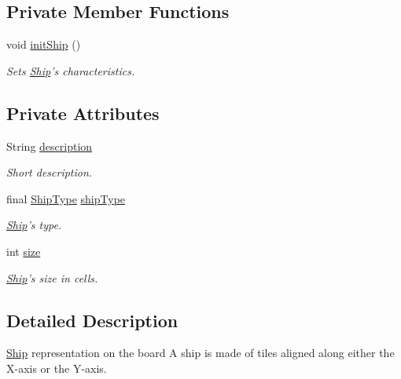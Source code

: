 \subsection*{Private Member Functions}
\begin{DoxyCompactItemize}
\item 
void \hyperlink{classbattleship2D_1_1model_1_1Ship_a677853c8501c31c34d69788df6c1c49d}{init\-Ship} ()
\begin{DoxyCompactList}\small\item\em Sets \hyperlink{classbattleship2D_1_1model_1_1Ship}{Ship}'s characteristics. \end{DoxyCompactList}\end{DoxyCompactItemize}
\subsection*{Private Attributes}
\begin{DoxyCompactItemize}
\item 
String \hyperlink{classbattleship2D_1_1model_1_1Ship_a902a3f9c168d56cc3c8d95747e133a3c}{description}
\begin{DoxyCompactList}\small\item\em Short description. \end{DoxyCompactList}\item 
final \hyperlink{enumbattleship2D_1_1model_1_1ShipType}{Ship\-Type} \hyperlink{classbattleship2D_1_1model_1_1Ship_a9291fcd44b67561c908b6c7e47dc844f}{ship\-Type}
\begin{DoxyCompactList}\small\item\em \hyperlink{classbattleship2D_1_1model_1_1Ship}{Ship}'s type. \end{DoxyCompactList}\item 
int \hyperlink{classbattleship2D_1_1model_1_1Ship_a8c1f963c60a57e54b2600e9ee3a5aef6}{size}
\begin{DoxyCompactList}\small\item\em \hyperlink{classbattleship2D_1_1model_1_1Ship}{Ship}'s size in cells. \end{DoxyCompactList}\end{DoxyCompactItemize}


\subsection{Detailed Description}
\hyperlink{classbattleship2D_1_1model_1_1Ship}{Ship} representation on the board A ship is made of tiles aligned along either the X-\/axis or the Y-\/axis. 


